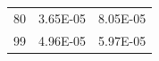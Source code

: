 \documentclass{jreport}		%
\begin{document}
\begin{table}
\begin{center}
\begin{tabular}{c|cc}
80&3.65E-05&8.05E-05 \\
99&4.96E-05&5.97E-05 \\ \hline
  \end{tabular}
  \end{center}
\end{table}
\end{document}
